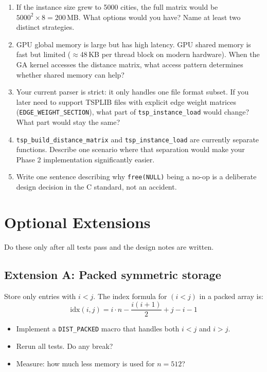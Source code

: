 \documentclass[11pt]{article}
\begin{document}
\begin{enumerate}[label=\arabic*., itemsep=6pt]
  \item If the instance size grew to 5000 cities, the full matrix would be $5000^2 \times 8 = 200$\,MB. What options would you have? Name at least two distinct strategies.

  \item GPU global memory is large but has high latency. GPU shared memory is fast but limited ($\approx$48\,KB per thread block on modern hardware). When the GA kernel accesses the distance matrix, what access pattern determines whether shared memory can help?

  \item Your current parser is strict: it only handles one file format subset. If you later need to support TSPLIB files with explicit edge weight matrices (\texttt{EDGE\_WEIGHT\_SECTION}), what part of \texttt{tsp\_instance\_load} would change? What part would stay the same?

  \item \texttt{tsp\_build\_distance\_matrix} and \texttt{tsp\_instance\_load} are currently separate functions. Describe one scenario where that separation would make your Phase 2 implementation significantly easier.

  \item Write one sentence describing why \texttt{free(NULL)} being a no-op is a deliberate design decision in the C standard, not an accident.
\end{enumerate}

\section{Optional Extensions}

Do these only after all tests pass and the design notes are written.

\subsection*{Extension A: Packed symmetric storage}
Store only entries with $i < j$. The index formula for $(i < j)$ in a packed array is:
\[
\text{idx}(i,j) = i \cdot n - \frac{i(i+1)}{2} + j - i - 1
\]
\begin{itemize}
  \item Implement a \texttt{DIST\_PACKED} macro that handles both $i < j$ and $i > j$.
  \item Rerun all tests. Do any break?
  \item Measure: how much less memory is used for $n = 512$?
\end{itemize}
\end{document}
